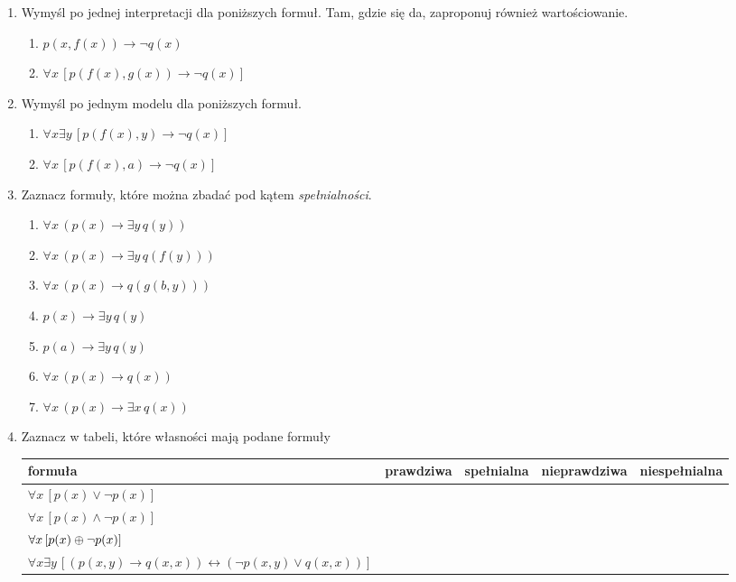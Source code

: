 \documentclass{mwart}
\newcommand{\xor}{\ensuremath\oplus}
\renewcommand{\iff}{\ensuremath\leftrightarrow}
\renewcommand{\iff}{\leftrightarrow}
\begin{document}
\begin{enumerate}
\begin{enumerate}
		\end{enumerate}
	\item Wymyśl po jednej interpretacji dla poniższych formuł. Tam, gdzie się da, zaproponuj również wartościowanie.
		\begin{multicols}{2}
			\begin{enumerate}
				\item $p(x, f(x)) \to \lnot q(x)$
				\item $\forall x\, [p(f(x), g(x)) \to \lnot q(x)]$
			\end{enumerate}
		\end{multicols}
	\item Wymyśl po jednym modelu dla poniższych formuł.
		\begin{multicols}{2}
			\begin{enumerate}
				\item $\forall x\exists y\, [p(f(x), y) \to \lnot q(x)]$
				\item $\forall x\, [p(f(x), a) \to \lnot q(x)]$
			\end{enumerate}
		\end{multicols}
	\item Zaznacz formuły, które można zbadać pod kątem \emph{spełnialności}.
		\begin{multicols}{3}
			\begin{enumerate}
				\item $\forall x\, (p(x)\to \exists y\, q(y))$
				\item $\forall x\, (p(x)\to \exists y\, q(f(y)))$
				\item $\forall x\, (p(x)\to q(g(b, y)))$
				\item $p(x)\to \exists y\, q(y)$
				\item $p(a)\to \exists y\, q(y)$
				\item $\forall x\, (p(x)\to q(x))$
				\item $\forall x\, (p(x)\to \exists x\, q(x))$
			\end{enumerate}
		\end{multicols}
	\item Zaznacz w tabeli, które własności mają podane formuły\\
		\begin{tabular}{|l|l|l|l|l|}
		\hline
		formuła & prawdziwa & spełnialna & nieprawdziwa & niespełnialna \\
		\hline
		$\forall x\, [p(x) \lor \lnot p(x)]$ & & & &  \\
		\hline
		$\forall x\, [p(x) \land \lnot p(x)]$ & & & & \\
		\hline
		$\forall x\, [p(x) \xor \lnot p(x)]$ & & & & \\
		\hline
		$\forall x\exists y\, [(p(x,y) \to q(x,x))\iff(\lnot p(x,y) \lor q(x,x))]$ & & & & \\
		\hline		
		\end{tabular}
\end{enumerate}
\end{document}
